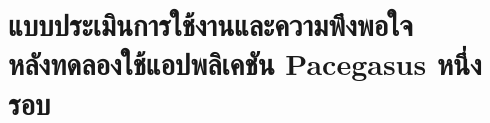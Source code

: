 \documentclass{cskkuproject}
\begin{document}
\chapter*{แบบประเมินการใช้งานและความพึงพอใจ\\หลังทดลองใช้แอปพลิเคชัน Pacegasus หนึ่งรอบ}

\clearpage


\end{document}
